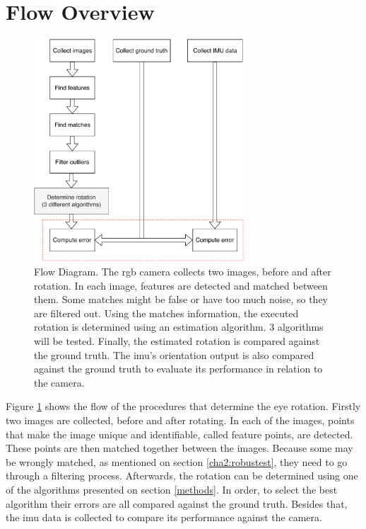 \section{Flow Overview}
\begin{figure}[ht]
	\centering
	\includegraphics[width=0.7\textwidth]{images/approach.pdf}
	\caption[Flow Diagram]{Flow Diagram. The \acrshort{rgb} camera collects two images, before and after rotation. In each image, features are detected and matched between them. Some matches might be false or have too much noise, so they are filtered out. Using the matches information, the executed rotation is determined using an estimation algorithm. 3 algorithms will be tested. Finally, the estimated rotation is compared against the ground truth. The \acrshort{imu}'s orientation output is also compared against the ground truth to evaluate its performance in relation to the camera.}
	\label{cha3:methodology:approach}
\end{figure}
Figure \ref{cha3:methodology:approach} shows the flow of the procedures that determine the eye rotation. Firstly two images are collected, before and after rotating. In each of the images, points that make the image unique and identifiable, called feature points, are detected. These points are then matched together between the images. Because some may be wrongly matched, as mentioned on section \ref{cha2:robustest}, they need to go through a filtering process. Afterwards, the rotation can be determined using one of the algorithms presented on section \ref{methods}. In order, to select the best algorithm their errors are all compared against the ground truth. Besides that, the \acrshort{imu} data is collected to compare its performance against the camera.\\

